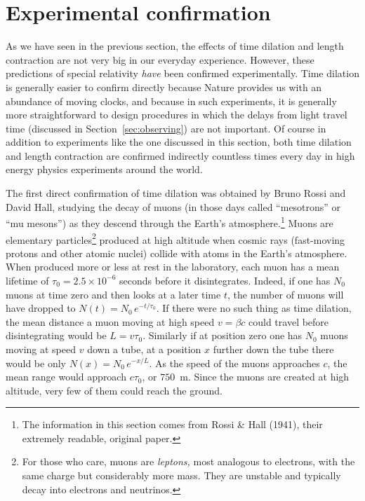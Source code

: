 \section{Experimental confirmation}
\label{sec:experimental}

As we have seen in the previous section, the effects of time dilation
and length contraction are not very big in our everyday experience.
However, these predictions of special relativity {\em have\/} been
confirmed experimentally.  Time dilation is generally easier to
confirm directly because Nature provides us with an abundance of
moving clocks, and because in such experiments, it is generally more
straightforward to design procedures in which the delays from light
travel time (discussed in Section~\ref{sec:observing}) are not
important. Of course in addition to experiments like the one discussed
in this section, both time dilation and length contraction are
confirmed indirectly countless times every day in high energy physics
experiments around the world.

The first direct confirmation of time dilation was obtained by Bruno
Rossi and David Hall, studying the
decay of muons (in those days called ``mesotrons'' or ``mu mesons'')
as they descend through the Earth's at\-mo\-sphere.\footnote{The
information in this section comes from Rossi \& Hall (1941), their
extremely readable, original paper.}  Muons are elementary
particles\footnote{For those who care, muons are {\em leptons,\/} most
analogous to electrons, with the same charge but considerably more
mass.  They are unstable and typically decay into electrons and
neutrinos.} produced at high altitude when cosmic rays (fast-moving
protons and other atomic nuclei) collide with atoms in the Earth's
atmosphere.  When produced more or less at rest in the laboratory,
each muon has a mean lifetime of $\tau_0=2.5\times 10^{-6}$ seconds
before it disintegrates.  Indeed, if one has $N_0$ muons at time zero
and then looks at a later time $t$, the number of muons will have
dropped to $N(t)=N_0\,e^{-t/\tau_0}$.  If there were no such thing as
time dilation, the mean distance a muon moving at high speed $v=\beta
c$ could travel before disintegrating would be $L=v\tau_0$.  Similarly
if at position zero one has $N_0$ muons moving at speed $v$ down a
tube, at a position $x$ further down the tube there would be only
$N(x)=N_0\,e^{-x/L}$.  As the speed of the muons approaches $c$, the
mean range would approach $c\tau_0$, or $750$~m.  Since the muons are
created at high altitude, very few of them could reach the ground.

